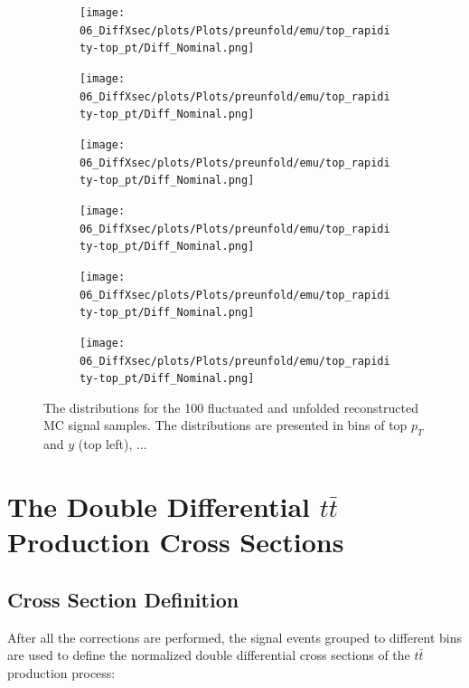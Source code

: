 \begin{figure}[h]
\centering
\begin{subfigure}
  \centering
  \texttt{[image: 06\_DiffXsec/plots/Plots/preunfold/emu/top\_rapidity-top\_pt/Diff\_Nominal.png]}
\end{subfigure}
\begin{subfigure}
  \centering
  \texttt{[image: 06\_DiffXsec/plots/Plots/preunfold/emu/top\_rapidity-top\_pt/Diff\_Nominal.png]}
\end{subfigure}
\begin{subfigure}
  \centering
  \texttt{[image: 06\_DiffXsec/plots/Plots/preunfold/emu/top\_rapidity-top\_pt/Diff\_Nominal.png]}
\end{subfigure}
\begin{subfigure}
  \centering
  \texttt{[image: 06\_DiffXsec/plots/Plots/preunfold/emu/top\_rapidity-top\_pt/Diff\_Nominal.png]}
\end{subfigure}
\begin{subfigure}
  \centering
  \texttt{[image: 06\_DiffXsec/plots/Plots/preunfold/emu/top\_rapidity-top\_pt/Diff\_Nominal.png]}
\end{subfigure}
\begin{subfigure}
  \centering
  \texttt{[image: 06\_DiffXsec/plots/Plots/preunfold/emu/top\_rapidity-top\_pt/Diff\_Nominal.png]}
\end{subfigure}
\caption{The distributions for the 100 fluctuated and unfolded reconstructed MC signal samples. The distributions are
         presented in bins of top $p_{T}$ and $y$ (top left), ...}
\label{fig:DiffovErr}
\end{figure}


\section{The Double Differential $t\bar{t}$ Production Cross Sections}

\subsection{Cross Section Definition}

After all the corrections are performed, the signal events grouped to different bins are used to define the normalized double differential cross sections
of the $t\bar{t}$ production process:

